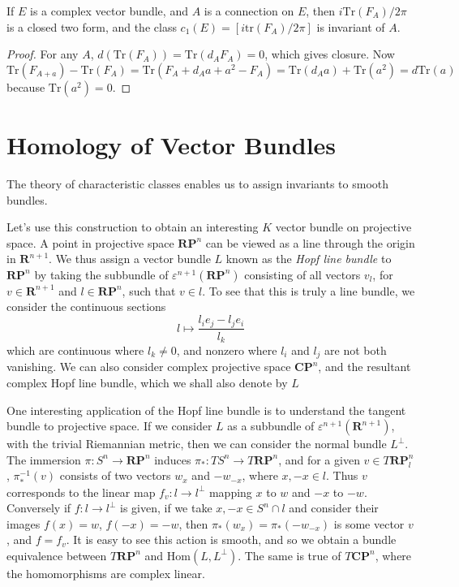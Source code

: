 \begin{theorem}
    If $E$ is a complex vector bundle, and $A$ is a connection on $E$, then $i \text{Tr}(F_A)/2\pi$ is a closed two form, and the class $c_1(E) = [i \text{tr}(F_A)/2 \pi]$ is invariant of $A$.
\end{theorem}
\begin{proof}
    For any $A$, $d(\text{Tr}(F_A)) = \text{Tr}(d_A F_A) = 0$, which gives closure. Now
    \[ \text{Tr}(F_{A + a}) - \text{Tr}(F_A) = \text{Tr}(F_A + d_A a + a^2 - F_A) = \text{Tr}(d_A a) + \text{Tr}(a^2) = d \text{Tr}(a) \]
    because $\text{Tr}(a^2) = 0$.
\end{proof}















\chapter{Homology of Vector Bundles}

The theory of characteristic classes enables us to assign invariants to smooth bundles.

Let's use this construction to obtain an interesting $K$ vector bundle on projective space. A point in projective space $\mathbf{RP}^n$ can be viewed as a line through the origin in $\mathbf{R}^{n+1}$. We thus assign a vector bundle $L$ known as the \emph{Hopf line bundle} to $\mathbf{RP}^n$ by taking the subbundle of $\varepsilon^{n+1}(\mathbf{RP}^n)$ consisting of all vectors $v_l$, for $v \in \mathbf{R}^{n+1}$ and $l \in \mathbf{RP}^n$, such that $v \in l$. To see that this is truly a line bundle, we consider the continuous sections
%
\[ l \mapsto \frac{l_i e_j - l_j e_i}{l_k} \]
%
which are continuous where $l_k \neq 0$, and nonzero where $l_i$ and $l_j$ are not both vanishing. We can also consider complex projective space $\mathbf{CP}^n$, and the resultant complex Hopf line bundle, which we shall also denote by $L$

One interesting application of the Hopf line bundle is to understand the tangent bundle to projective space. If we consider $L$ as a subbundle of $\varepsilon^{n+1}(\mathbf{R}^{n+1})$, with the trivial Riemannian metric, then we can consider the normal bundle $L^\perp$. The immersion $\pi: S^n \to \mathbf{RP}^n$ induces $\pi_*: TS^n \to T\mathbf{RP}^n$, and for a given $v \in T\mathbf{RP}^n_l$, $\pi_*^{-1}(v)$ consists of two vectors $w_x$ and $-w_{-x}$, where $x,-x \in l$. Thus $v$ corresponds to the linear map $f_v: l \to l^\perp$ mapping $x$ to $w$ and $-x$ to $-w$. Conversely if $f: l \to l^\perp$ is given, if we take $x,-x \in S^n \cap l$ and consider their images $f(x) = w$, $f(-x) = -w$, then $\pi_*(w_x) = \pi_*(-w_{-x})$ is some vector $v$, and $f = f_v$. It is easy to see this action is smooth, and so we obtain a bundle equivalence between $T\mathbf{RP}^n$ and $\text{Hom}(L,L^\perp)$. The same is true of $T\mathbf{CP}^n$, where the homomorphisms are complex linear.

